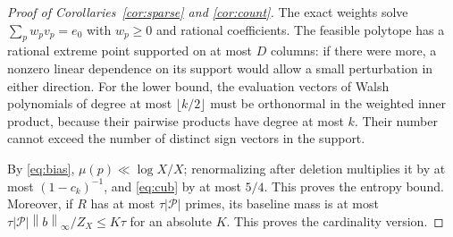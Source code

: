 \documentclass[11pt]{article}
\theoremstyle{remark}\newtheorem{remark}[theorem]{Remark}
\newcommand{\Pp}{\mathcal P}
\newcommand{\norm}[1]{\left\|#1\right\|}
\begin{document}
\begin{proof}[Proof of Corollaries~\ref{cor:sparse} and \ref{cor:count}]
The exact weights solve $\sum_p w_p v_p=e_0$ with $w_p\ge0$ and rational coefficients. The feasible polytope has a rational extreme point supported on at most $D$ columns: if there were more, a nonzero linear dependence on its support would allow a small perturbation in either direction. For the lower bound, the evaluation vectors of Walsh polynomials of degree at most $\lfloor k/2\rfloor$ must be orthonormal in the weighted inner product, because their pairwise products have degree at most $k$. Their number cannot exceed the number of distinct sign vectors in the support.

By \eqref{eq:bias}, $\mu(p)\ll \log X/X$; renormalizing after deletion multiplies it by at most $(1-c_k)^{-1}$, and \eqref{eq:cub} by at most $5/4$. This proves the entropy bound. Moreover, if $R$ has at most $\tau|\Pp|$ primes, its baseline mass is at most $\tau|\Pp|\norm b_\infty/Z_X\le K\tau$ for an absolute $K$. This proves the cardinality version.
\end{proof}
\end{document}
